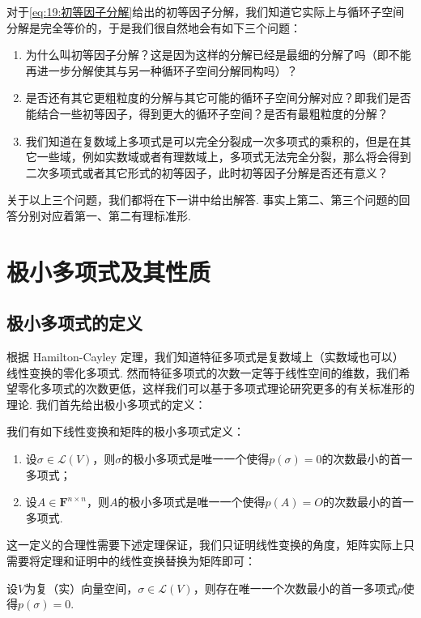 对于\autoref{eq:19:初等因子分解}给出的初等因子分解，我们知道它实际上与循环子空间分解是完全等价的，于是我们很自然地会有如下三个问题：
\begin{enumerate}
    \item 为什么叫初等因子分解？这是因为这样的分解已经是最细的分解了吗（即不能再进一步分解使其与另一种循环子空间分解同构吗）？
    \item 是否还有其它更粗粒度的分解与其它可能的循环子空间分解对应？即我们是否能结合一些初等因子，得到更大的循环子空间？是否有最粗粒度的分解？
    \item 我们知道在复数域上多项式是可以完全分裂成一次多项式的乘积的，但是在其它一些域，例如实数域或者有理数域上，多项式无法完全分裂，那么将会得到二次多项式或者其它形式的初等因子，此时初等因子分解是否还有意义？
\end{enumerate}

关于以上三个问题，我们都将在下一讲中给出解答. 事实上第二、第三个问题的回答分别对应着第一、第二有理标准形.

\section{极小多项式及其性质}
\subsection{极小多项式的定义}

根据 Hamilton-Cayley 定理，我们知道特征多项式是复数域上（实数域也可以）线性变换的零化多项式. 然而特征多项式的次数一定等于线性空间的维数，我们希望零化多项式的次数更低，这样我们可以基于多项式理论研究更多的有关标准形的理论. 我们首先给出极小多项式的定义：
\begin{definition}
    我们有如下线性变换和矩阵的极小多项式定义：
    \begin{enumerate}
        \item 设$\sigma\in \mathcal{L}(V)$，则$\sigma$的极小多项式是唯一一个使得$p(\sigma)=0$的次数最小的首一多项式；

        \item 设$A\in\mathbf{F}^{n\times n}$，则$A$的极小多项式是唯一一个使得$p(A)=O$的次数最小的首一多项式.
    \end{enumerate}
\end{definition}
这一定义的合理性需要下述定理保证，我们只证明线性变换的角度，矩阵实际上只需要将定理和证明中的线性变换替换为矩阵即可：
\begin{theorem}\label{thm:21:极小多项式存在}
    设$V$为复（实）向量空间，$\sigma\in \mathcal{L}(V)$，则存在唯一一个次数最小的首一多项式$p$使得$p(\sigma)=0$.
\end{theorem}

